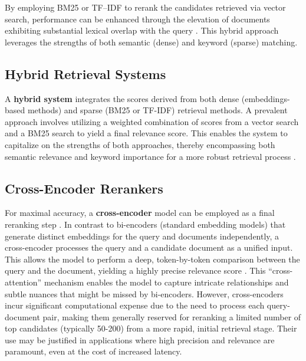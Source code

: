 By employing BM25 or TF–IDF to rerank the candidates retrieved via vector search, performance can be enhanced through the elevation of documents exhibiting substantial lexical overlap with the query \autocite{gao2024retrievalaugmentedgenerationlargelanguage}. This hybrid approach leverages the strengths of both semantic (dense) and keyword (sparse) matching.

\subsection{Hybrid Retrieval Systems}
A \textbf{hybrid system} integrates the scores derived from both dense (embeddings-based methods) and sparse (BM25 or TF-IDF) retrieval methods. A prevalent approach involves utilizing a weighted combination of scores from a vector search and a BM25 search to yield a final relevance score. This enables the system to capitalize on the strengths of both approaches, thereby encompassing both semantic relevance and keyword importance for a more robust retrieval process \autocite{gao2024retrievalaugmentedgenerationlargelanguage}.

\subsection{Cross-Encoder Rerankers}
For maximal accuracy, a \textbf{cross-encoder} model can be employed as a final reranking step \autocite{nogueira2019passage}. In contrast to bi-encoders (standard embedding models) that generate distinct embeddings for the query and documents independently, a cross-encoder processes the query and a candidate document as a unified input. This allows the model to perform a deep, token-by-token comparison between the query and the document, yielding a highly precise relevance score \autocite{khattab2020colbertefficienteffectivepassage}. This \enquote{cross-attention} mechanism enables the model to capture intricate relationships and subtle nuances that might be missed by bi-encoders. However, cross-encoders incur significant computational expense due to the need to process each query-document pair, making them generally reserved for reranking a limited number of top candidates (typically 50-200) from a more rapid, initial retrieval stage. Their use may be justified in applications where high precision and relevance are paramount, even at the cost of increased latency.

